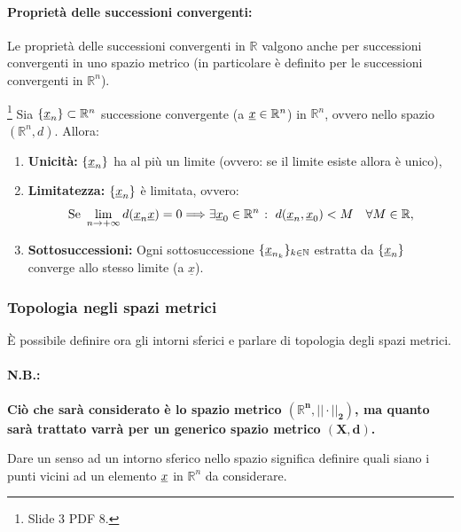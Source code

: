 \paragraph{Proprietà delle successioni convergenti:}  Le proprietà delle successioni convergenti in $\mathbb R$ valgono anche per successioni convergenti in uno spazio metrico (in particolare è definito per le successioni convergenti in $\mathbb R^n$).
\begin{proposition}\label{prop:successione_convergente_Rn}\footnote{Slide 3 PDF 8.}
    Sia $\{\uline x_n\}\subset\mathbb R^n$ successione convergente (a $\uline x\in\mathbb R^n$) in $\mathbb R^n$, ovvero nello spazio $(\mathbb R^n,d)$. Allora:
    \begin{enumerate}
        \item\textbf{Unicità:} $\{\uline x_n\}$ ha al più un limite (ovvero: se il limite esiste allora è unico),
        \item\textbf{Limitatezza:} $\{\uline x_n\}$ è limitata, ovvero:
        \begin{equation*}
            \text{Se } \lim_{n\rightarrow+\infty}d(\uline x_n\uline x)=0\Longrightarrow \exists\uline x_0\in\mathbb R^n \;\colon\; d(\uline x_n, \uline x_0)<M\quad \forall M\in\mathbb R,
        \end{equation*}
        \item\textbf{Sottosuccessioni:} Ogni \gls{sottosuccessione} $\{\uline x_{n_k}\}_{k\in\mathbb N}$ estratta da $\{\uline x_n\}$ converge allo stesso limite (a $\underline x$).
    \end{enumerate}
\end{proposition}

\subsubsection{Topologia negli spazi metrici}
È possibile definire ora gli intorni sferici e parlare di topologia degli spazi metrici.

\paragraph{N.B.:} \textbf{Ciò che sarà considerato è lo spazio metrico $\boldsymbol{(\mathbb R^n,||\cdot||_2)}$, ma quanto sarà trattato varrà per un generico spazio metrico $\boldsymbol{(X,d)}$.}

Dare un senso ad un intorno sferico nello spazio significa definire quali siano i punti vicini ad un elemento $\uline x$ in $\mathbb R^n$ da considerare.

